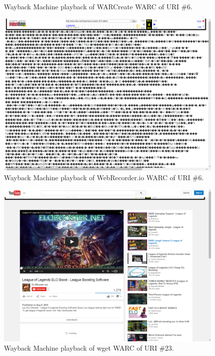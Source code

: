 \documentclass[a4paper,12pt]{article}
\begin{document}
\begin{appendices}
\begin{figure}[H]
    \caption{Wayback Machine playback of WARCreate WARC of URI \#6.}
\end{figure}
\begin{figure}[H]
    \centering
    \includegraphics[scale=0.5]{images/6_webrecorder_in_wayback.png}
    \caption{Wayback Machine playback of WebRecorder.io WARC of URI \#6.}
\end{figure}
\begin{figure}[H]
    \centering
    \includegraphics[scale=0.5]{images/23_wget_in_wayback.png}
    \caption{Wayback Machine playback of wget WARC of URI \#23.}
\end{figure}
\begin{figure}[H]
    \centering

\end{figure}
\end{appendices}
\end{document}
